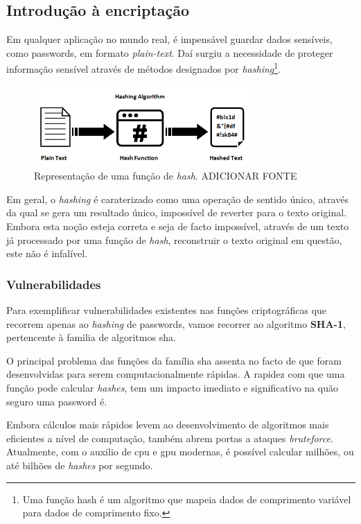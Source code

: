 \cleardoublepage
\subsection{Introdução à encriptação}

Em qualquer aplicação no mundo real, é impensável guardar dados sensíveis, como passwords, em formato \emph{plain-text}. Daí surgiu a necessidade de proteger informação sensível através de métodos designados por \emph{hashing}\footnote{Uma função hash é um algoritmo que mapeia dados de comprimento variável para dados de comprimento fixo.}.\\

\begin{figure}[h]
    \centering
    \includegraphics[width=0.75\textwidth]{img/bcrypt/Hashing.png}
    \caption{Representação de uma função de \emph{hash}. ADICIONAR FONTE}
\end{figure}

Em geral, o \emph{hashing} é caraterizado como uma operação de sentido único, através da qual se gera um resultado único, impossível de reverter para o texto original.
Embora esta noção esteja correta e seja de facto impossível, através de um texto já processado por uma função de \emph{hash}, reconstruir o texto original em questão, este não é infalível.

\cleardoublepage
\subsubsection{Vulnerabilidades}

Para exemplificar vulnerabilidades existentes nas funções criptográficas que recorrem apenas ao \emph{hashing} de passwords, vamos recorrer ao algoritmo \textbf{SHA-1}, pertencente à familia de algoritmos \gls{sha}.

O principal problema das funções da família \gls{sha} assenta no facto de que foram desenvolvidas para serem computacionalmente rápidas. A rapidez com que uma função pode calcular \emph{hashes}, tem um impacto imediato e significativo na quão seguro uma password é.

Embora cálculos mais rápidos levem ao desenvolvimento de algoritmos mais eficientes a nível de computação, também abrem portas a ataques \emph{bruteforce}. Atualmente, com o auxilio de \gls{cpu} e \gls{gpu} modernas, é possível calcular milhões, ou até bilhões de \emph{hashes} por segundo.

